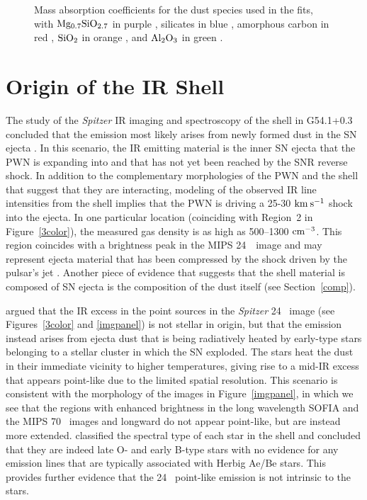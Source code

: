 \documentclass{emulateapj}
\newcommand{\spitzer}{\textit{Spitzer }}
\begin{document}
\begin{figure}
\center
{} 
\caption{\label{kappas}Mass absorption coefficients for the dust species used in the fits, with $\rm Mg_{0.7}SiO_{2.7}$ in purple \citep{jager03}, silicates in blue \citep{weingartner01}, amorphous carbon in red \citep{rouleau91}, $\rm SiO_2$ in orange \citep{henning97}, and $\rm Al_2O_3$ in green \citep{begemann97}.}
\end{figure}



\section{Origin of the IR Shell}\label{origin}


The study of the \spitzer IR imaging and spectroscopy of the shell in G54.1+0.3 concluded that the emission most likely arises from newly formed dust in the SN ejecta \citep{temim10}. In this scenario, the IR emitting material is the inner SN ejecta that the PWN is expanding into and that has not yet been reached by the SNR reverse shock. 
In addition to the complementary morphologies of the PWN and the shell that suggest that they are interacting, modeling of the observed IR line intensities from the shell implies that the PWN is driving a 25-30 $\rm km\:s^{-1}$ shock into the ejecta. In one particular location (coinciding with Region~2 in Figure~\ref{3color}), the measured gas density is as high as 500--1300 $\rm cm^{-3}$. This region coincides with a brightness peak in the MIPS 24~\micron\ image and may represent ejecta material that has been compressed by the shock driven by the pulsar's jet \citep{temim10}.
Another piece of evidence that suggests that the shell material is composed of SN ejecta is the composition of the dust itself (see Section~\ref{comp}). 

\citet{temim10} argued that the IR excess in the point sources in the \spitzer 24 \micron\ image (see Figures~\ref{3color} and \ref{imgpanel}) is not stellar in origin, but that the emission instead arises from ejecta dust that is being radiatively heated by early-type stars belonging to a stellar cluster in which the SN exploded. The stars heat the dust in their immediate vicinity to higher temperatures, giving rise to a mid-IR excess that appears point-like due to the limited spatial resolution. 
This scenario is consistent with the morphology of the images in Figure~\ref{imgpanel}, in which we see that the regions with enhanced brightness in the long wavelength SOFIA and the MIPS 70 \micron\ images and longward do not appear point-like, but are instead more extended. \citet{kim13} classified the spectral type of each star in the shell and concluded that they are indeed late O- and early B-type stars with no evidence for any emission lines that are typically associated with Herbig Ae/Be stars. This provides further evidence that the 24 \micron\ point-like emission is not intrinsic to the stars.
\end{document}
